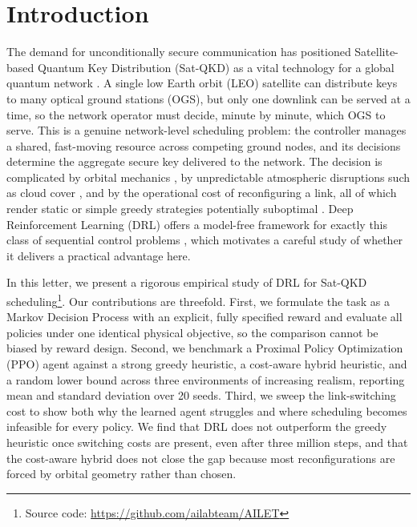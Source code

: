\documentclass[manuscript, review, nonacm]{acmart}
\newcommand{\Nseed}{20}
\begin{document}
\maketitle

\section{Introduction}\label{sec:introduction}
The demand for unconditionally secure communication has positioned Satellite-based Quantum Key Distribution (Sat-QKD) as a vital technology for a global quantum network \cite{gisin2002quantum, liao2017satellite}. A single low Earth orbit (LEO) satellite can distribute keys to many optical ground stations (OGS), but only one downlink can be served at a time, so the network operator must decide, minute by minute, which OGS to serve. This is a genuine network-level scheduling problem: the controller manages a shared, fast-moving resource across competing ground nodes, and its decisions determine the aggregate secure key delivered to the network. The decision is complicated by orbital mechanics \cite{deniz2021routing}, by unpredictable atmospheric disruptions such as cloud cover \cite{bourgoin2013comprehensive}, and by the operational cost of reconfiguring a link, all of which render static or simple greedy strategies potentially suboptimal \cite{oi2021optimization}. Deep Reinforcement Learning (DRL) offers a model-free framework for exactly this class of sequential control problems \cite{sutton2018reinforcement}, which motivates a careful study of whether it delivers a practical advantage here.

In this letter, we present a rigorous empirical study of DRL for Sat-QKD scheduling\footnote{Source code: \url{https://github.com/ailabteam/AILET}}. Our contributions are threefold. First, we formulate the task as a Markov Decision Process with an explicit, fully specified reward and evaluate all policies under one identical physical objective, so the comparison cannot be biased by reward design. Second, we benchmark a Proximal Policy Optimization (PPO) agent against a strong greedy heuristic, a cost-aware hybrid heuristic, and a random lower bound across three environments of increasing realism, reporting mean and standard deviation over \Nseed{} seeds. Third, we sweep the link-switching cost to show both why the learned agent struggles and where scheduling becomes infeasible for every policy. We find that DRL does not outperform the greedy heuristic once switching costs are present, even after three million steps, and that the cost-aware hybrid does not close the gap because most reconfigurations are forced by orbital geometry rather than chosen.
\end{document}
